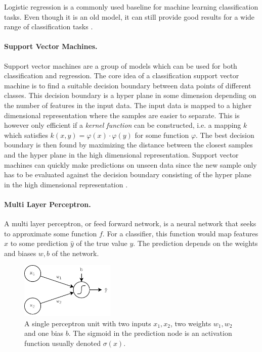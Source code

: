 Logistic regression is a commonly used baseline for machine learning classification tasks. Even though it is an old model, it can still provide good results for a wide range of classification tasks \citep{chollet2017deep}. 

\paragraph{Support Vector Machines.}

Support vector machines are a group of models which can be used for both classification and regression. The core idea of a classification support vector machine is to find a suitable decision boundary between data points of different classes. This decision boundary is a hyper plane in some dimension depending on the number of features in the input data. The input data is mapped to a higher dimensional representation where the samples are easier to separate. This is however only efficient if a \emph{kernel function} can be constructed, i.e. a mapping $k$ which satisfies $k(x,y) = \varphi(x) \cdot \varphi(y)$ for some function $\varphi$. The best decision boundary is then found by maximizing the distance between the closest samples and the hyper plane in the high dimensional representation. Support vector machines can quickly make predictions on unseen data since the new sample only has to be evaluated against the decision boundary consisting of the hyper plane in the high dimensional representation \citep{chollet2017deep}.   

\paragraph{Multi Layer Perceptron.}
A multi layer perceptron, or feed forward network, is a neural network that seeks to approximate some function $f$. For a classifier, this function would map features $x$ to some prediction $\hat{y}$ of the true value $y$. The prediction depends on the weights and biases $w,b$ of the network.  

\begin{figure}[t]
    \centering
    \includegraphics[width=0.4\textwidth]{Figures/figs-perceptron.pdf}
    \caption{A single perceptron unit with two inputs $x_1, x_2$, two weights $w_1, w_2$ and one bias $b$. The sigmoid in the prediction node is an activation function usually denoted $\sigma(x)$.}
    \label{fig:perceptron}
\end{figure}

